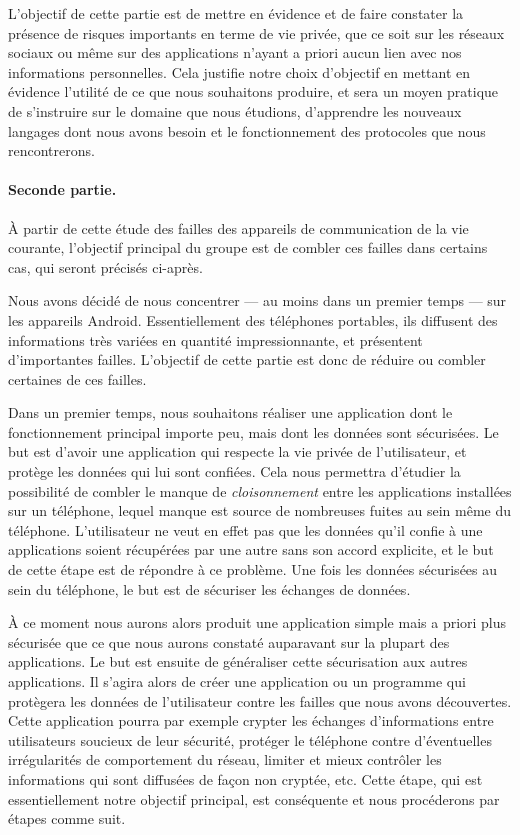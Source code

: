 \documentclass[a4paper, 12pt,twoside]{article}
\begin{document}
		L'objectif de cette partie est de mettre en évidence et de faire constater la présence de risques importants en terme de vie privée, que ce soit sur les réseaux sociaux ou même sur des applications n'ayant a priori aucun lien avec nos informations personnelles. Cela justifie notre choix d'objectif en mettant en évidence l'utilité de ce que nous souhaitons produire, et sera un moyen pratique de s'instruire sur le domaine que nous étudions, d'apprendre les nouveaux langages dont nous avons besoin et le fonctionnement des protocoles que nous rencontrerons.
		
		\paragraph{Seconde partie. } À partir de cette étude des failles des appareils de communication de la vie courante, l'objectif principal du groupe est de combler ces failles dans certains cas, qui seront précisés ci-après.
		
		Nous avons décidé de nous concentrer — au moins dans un premier temps — sur les appareils Android. Essentiellement des téléphones portables, ils diffusent des informations très variées en quantité impressionnante, et présentent d'importantes failles. L'objectif de cette partie est donc de réduire ou combler certaines de ces failles.
		
		Dans un premier temps, nous souhaitons réaliser une application dont le fonctionnement principal importe peu, mais dont les données sont sécurisées. Le but est d'avoir une application qui respecte la vie privée de l'utilisateur, et protège les données qui lui sont confiées. Cela nous permettra d'étudier la possibilité de combler le manque de \emph{cloisonnement} entre les applications installées sur un téléphone, lequel manque est source de nombreuses fuites au sein même du téléphone. L'utilisateur ne veut en effet pas que les données qu'il confie à une applications soient récupérées par une autre sans son accord explicite, et le but de cette étape est de répondre à ce problème. Une fois les données sécurisées au sein du téléphone, le but est de sécuriser les échanges de données.
		
		À ce moment nous aurons alors produit une application simple mais a priori plus sécurisée que ce que nous aurons constaté auparavant sur la plupart des applications. Le but est ensuite de généraliser cette sécurisation aux autres applications. Il s'agira alors de créer une application ou un programme qui protègera les données de l'utilisateur contre les failles que nous avons découvertes. Cette application pourra par exemple crypter les échanges d'informations entre utilisateurs soucieux de leur sécurité, protéger le téléphone contre d'éventuelles irrégularités de comportement du réseau, limiter et mieux contrôler les informations qui sont diffusées de façon non cryptée, etc. Cette étape, qui est essentiellement notre objectif principal, est conséquente et nous procéderons par étapes comme suit.
		
\end{document}
